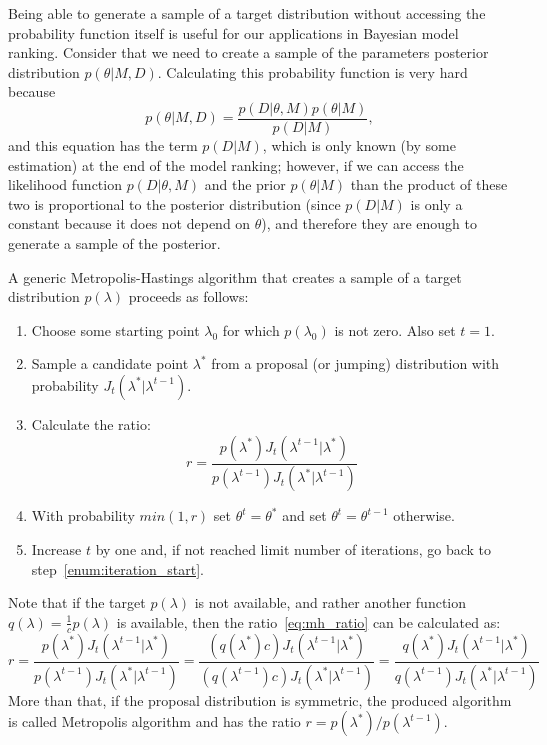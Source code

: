 Being able to generate a sample of a target distribution without 
accessing the probability function itself is useful for our applications
in Bayesian model ranking. Consider that we need to create a sample of
the parameters posterior distribution $p (\theta | M, D)$. Calculating 
this probability function is very hard because
\begin{equation*}
    p(\theta | M, D) = \frac{p (D | \theta, M) p (\theta | M)}
                            {p (D|M)},
\end{equation*}
and this equation has the term $p (D|M)$, which is only known (by some 
estimation) at the end of the model ranking; however, if we can access
the likelihood function $p (D| \theta, M)$ and the prior 
$p (\theta | M)$ than the product of these two is proportional to the 
posterior distribution (since $p (D|M)$ is only a constant because it
does not depend on $\theta$), and therefore they are enough to generate
a sample of the posterior.

A generic Metropolis-Hastings algorithm that creates a sample of a 
target distribution $p (\lambda)$ proceeds as follows:
\begin{enumerate}
\item{Choose some starting point $\lambda_0$ for which $p (\lambda_0)$ 
    is not zero. Also set $t = 1$.}
\item{Sample a candidate point $\lambda^*$ from a proposal (or jumping) 
    distribution with probability $J_t (\lambda^* | \lambda^{t - 1})$.}
    \label{enum:iteration_start}
\item{Calculate the ratio:}
    \begin{equation}
        r = \frac{p (\lambda^*) J_t (\lambda^{t - 1} | \lambda^*)}
                 {p (\lambda^{t - 1}) J_t (\lambda^* | \lambda^{t - 1})}
        \label{eq:mh_ratio}
    \end{equation}
\item{With probability $min (1, r)$ set $\theta^t = \theta^*$ and set
    $\theta^t = \theta^{t - 1}$ otherwise.}
\item{Increase $t$ by one and, if not reached limit number of 
    iterations, go back to step~\ref{enum:iteration_start}.}
\end{enumerate}
Note that if the target $p (\lambda)$ is not available, and rather 
another function $q (\lambda) = \frac{1}{c}p(\lambda)$ is available, 
then the ratio~\ref{eq:mh_ratio} can be calculated as:
\begin{equation*}
    r = \frac{p (\lambda^*) J_t (\lambda^{t - 1} | \lambda^*)}
              {p (\lambda^{t - 1}) J_t (\lambda^* | \lambda^{t - 1})} 
      = \frac{(q (\lambda^*)c) J_t (\lambda^{t - 1} | \lambda^*)}
           {(q (\lambda^{t - 1})c) J_t (\lambda^* | \lambda^{t - 1})} 
      = \frac{q (\lambda^*) J_t (\lambda^{t - 1} | \lambda^*)}
              {q (\lambda^{t - 1}) J_t (\lambda^* | \lambda^{t - 1})}
\end{equation*}
More than that, if the proposal distribution is symmetric, the produced 
algorithm is called Metropolis algorithm and has the ratio 
$r = {p (\lambda^*)}/{p (\lambda^{t - 1})}$. 

